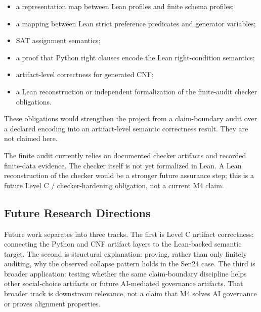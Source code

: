 \begin{itemize}[leftmargin=*]
\item a representation map between Lean profiles and finite schema profiles;
\item a mapping between Lean strict preference predicates and generator
  variables;
\item SAT assignment semantics;
\item a proof that Python right clauses encode the Lean right-condition
  semantics;
\item artifact-level correctness for generated CNF;
\item a Lean reconstruction or independent formalization of the finite-audit
  checker obligations.
\end{itemize}

These obligations would strengthen the project from a claim-boundary audit
over a declared encoding into an artifact-level semantic correctness result.
They are not claimed here.

The finite audit currently relies on documented checker artifacts and recorded
finite-data evidence. The checker itself is not yet formalized in Lean. A Lean
reconstruction of the checker would be a stronger future assurance step; this
is a future Level C / checker-hardening obligation, not a current M4 claim.

\subsection*{Future Research Directions}

Future work separates into three tracks. The first is Level C artifact
correctness: connecting the Python and CNF artifact layers to the Lean-backed
semantic target. The second is structural explanation: proving, rather than
only finitely auditing, why the observed collapse pattern holds in the Sen24
case. The third is broader application: testing whether the same
claim-boundary discipline helps other social-choice artifacts or future
AI-mediated governance artifacts. That broader track is downstream relevance,
not a claim that M4 solves AI governance or proves alignment properties.
